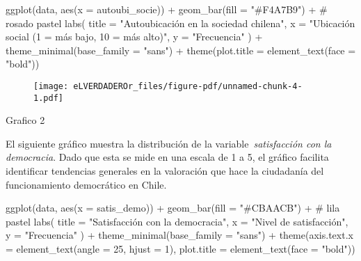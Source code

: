 \documentclass[
  11pt,
]{article}
\newenvironment{Shaded}{\begin{snugshade}}{\end{snugshade}}
\newcommand{\AttributeTok}[1]{\textcolor[rgb]{0.40,0.45,0.13}{#1}}
\newcommand{\CommentTok}[1]{\textcolor[rgb]{0.37,0.37,0.37}{#1}}
\newcommand{\DecValTok}[1]{\textcolor[rgb]{0.68,0.00,0.00}{#1}}
\newcommand{\FunctionTok}[1]{\textcolor[rgb]{0.28,0.35,0.67}{#1}}
\newcommand{\NormalTok}[1]{\textcolor[rgb]{0.00,0.23,0.31}{#1}}
\newcommand{\SpecialCharTok}[1]{\textcolor[rgb]{0.37,0.37,0.37}{#1}}
\newcommand{\StringTok}[1]{\textcolor[rgb]{0.13,0.47,0.30}{#1}}
\begin{document}
\begin{Shaded}
\begin{Highlighting}[]
\FunctionTok{ggplot}\NormalTok{(data, }\FunctionTok{aes}\NormalTok{(}\AttributeTok{x =}\NormalTok{ autoubi\_socie)) }\SpecialCharTok{+}
  \FunctionTok{geom\_bar}\NormalTok{(}\AttributeTok{fill =} \StringTok{"\#F4A7B9"}\NormalTok{) }\SpecialCharTok{+}  \CommentTok{\# rosado pastel}
  \FunctionTok{labs}\NormalTok{(}
    \AttributeTok{title =} \StringTok{"Autoubicación en la sociedad chilena"}\NormalTok{,}
    \AttributeTok{x =} \StringTok{"Ubicación social (1 = más bajo, 10 = más alto)"}\NormalTok{,}
    \AttributeTok{y =} \StringTok{"Frecuencia"}
\NormalTok{  ) }\SpecialCharTok{+}
  \FunctionTok{theme\_minimal}\NormalTok{(}\AttributeTok{base\_family =} \StringTok{"sans"}\NormalTok{) }\SpecialCharTok{+}
  \FunctionTok{theme}\NormalTok{(}\AttributeTok{plot.title =} \FunctionTok{element\_text}\NormalTok{(}\AttributeTok{face =} \StringTok{"bold"}\NormalTok{))}
\end{Highlighting}
\end{Shaded}

\begin{figure}[H]

{\centering \texttt{[image: eLVERDADEROr\_files/figure-pdf/unnamed-chunk-4-1.pdf]}

}

\end{figure}

Grafico 2

El siguiente gráfico muestra la distribución de la
variable~\emph{satisfacción con la democracia}. Dado que esta se mide en
una escala de 1 a 5, el gráfico facilita identificar tendencias
generales en la valoración que hace la ciudadanía del funcionamiento
democrático en Chile.

\begin{Shaded}
\begin{Highlighting}[]
\FunctionTok{ggplot}\NormalTok{(data, }\FunctionTok{aes}\NormalTok{(}\AttributeTok{x =}\NormalTok{ satis\_demo)) }\SpecialCharTok{+}
  \FunctionTok{geom\_bar}\NormalTok{(}\AttributeTok{fill =} \StringTok{"\#CBAACB"}\NormalTok{) }\SpecialCharTok{+}  \CommentTok{\# lila pastel}
  \FunctionTok{labs}\NormalTok{(}
    \AttributeTok{title =} \StringTok{"Satisfacción con la democracia"}\NormalTok{,}
    \AttributeTok{x =} \StringTok{"Nivel de satisfacción"}\NormalTok{,}
    \AttributeTok{y =} \StringTok{"Frecuencia"}
\NormalTok{  ) }\SpecialCharTok{+}
  \FunctionTok{theme\_minimal}\NormalTok{(}\AttributeTok{base\_family =} \StringTok{"sans"}\NormalTok{) }\SpecialCharTok{+}
  \FunctionTok{theme}\NormalTok{(}\AttributeTok{axis.text.x =} \FunctionTok{element\_text}\NormalTok{(}\AttributeTok{angle =} \DecValTok{25}\NormalTok{, }\AttributeTok{hjust =} \DecValTok{1}\NormalTok{),}
        \AttributeTok{plot.title =} \FunctionTok{element\_text}\NormalTok{(}\AttributeTok{face =} \StringTok{"bold"}\NormalTok{))}
\end{Highlighting}
\end{Shaded}
\end{document}
